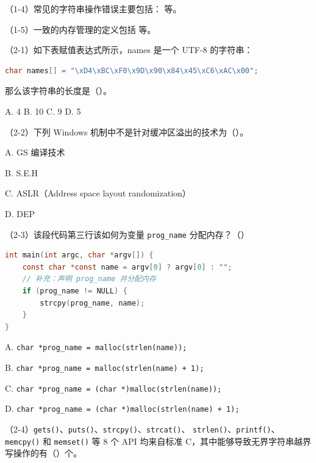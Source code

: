 \documentclass[UTF8]{ctexart}
\begin{document}
\vspace{0.8em}

\noindent
（1-4）常见的字符串操作错误主要包括：
\underline{\hspace{8cm}}
等。

\vspace{0.8em}

\noindent
（1-5）一致的内存管理的定义包括
\underline{\hspace{8cm}}
等。

\noindent
（2-1）如下表赋值表达式所示，names 是一个 UTF-8 的字符串：

\begin{lstlisting}[language=C]
char names[] = "\xD4\xBC\xF0\x9D\x90\x84\x45\xC6\xAC\x00";
\end{lstlisting}

\noindent
那么该字符串的长度是（\quad）。

\noindent
A. 4 \quad
B. 10 \quad
C. 9 \quad
D. 5


\noindent
（2-2）下列 Windows 机制中不是针对缓冲区溢出的技术为（\quad）。

\noindent
A. GS 编译技术

\noindent
B. S.E.H

\noindent
C. ASLR（Address space layout randomization）

\noindent
D. DEP


\noindent
（2-3）该段代码第三行该如何为变量 \texttt{prog\_name} 分配内存？（\quad）

\begin{lstlisting}[language=C]
int main(int argc, char *argv[]) {
    const char *const name = argv[0] ? argv[0] : "";
    // 补充：声明 prog_name 并分配内存
    if (prog_name != NULL) {
        strcpy(prog_name, name);
    }
}
\end{lstlisting}

\noindent
A. \texttt{char *prog\_name = malloc(strlen(name));}

\noindent
B. \texttt{char *prog\_name = malloc(strlen(name) + 1);}

\noindent
C. \texttt{char *prog\_name = (char *)malloc(strlen(name));}

\noindent
D. \texttt{char *prog\_name = (char *)malloc(strlen(name) + 1);}


\noindent
（2-4）\texttt{gets()}、\texttt{puts()}、\texttt{strcpy()}、\texttt{strcat()}、
\texttt{strlen()}、\texttt{printf()}、\texttt{memcpy()} 和 \texttt{memset()}
等 8 个 API 均来自标准 C，其中能够导致无界字符串越界写操作的有（\quad）个。
\end{document}
